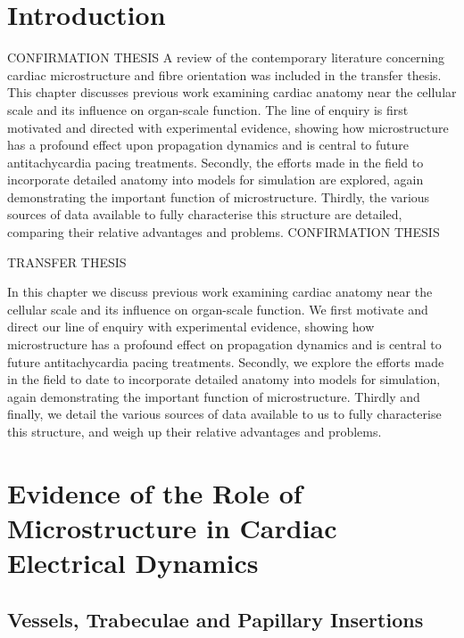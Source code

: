 
\section{Introduction}
\label{sec:review:introduction}
CONFIRMATION THESIS
A review of the contemporary literature concerning cardiac microstructure and fibre orientation was included in the transfer thesis. This chapter discusses previous work examining cardiac anatomy near the cellular scale and its influence on organ-scale function. The line of enquiry is first motivated and directed with experimental evidence, showing how microstructure has a profound effect upon propagation dynamics and is central to future antitachycardia pacing treatments. Secondly, the efforts made in the field to incorporate detailed anatomy into models for simulation are explored, again demonstrating the important function of microstructure. Thirdly, the various sources of data available to fully characterise this structure are detailed, comparing their relative advantages and problems.
CONFIRMATION THESIS

TRANSFER THESIS

In this chapter we discuss previous work examining cardiac anatomy near the cellular scale and its influence on organ-scale function. We first motivate and direct our line of enquiry with experimental evidence, showing how microstructure has a profound effect on propagation dynamics and is central to future antitachycardia pacing treatments. Secondly, we explore the efforts made in the field to date to incorporate detailed anatomy into models for simulation, again demonstrating the important function of microstructure. Thirdly and finally, we detail the various sources of data available to us to fully characterise this structure, and weigh up their relative advantages and problems.
\section{Evidence of the Role of Microstructure in Cardiac Electrical Dynamics} %
\label{sec:microstructure_has_profound_macroscopic_effects_on_propagation_dynamics}

  \subsection{Vessels, Trabeculae and Papillary Insertions} %
  \label{sub:vessels_trabeculae_and_papillary_insertions}
  
